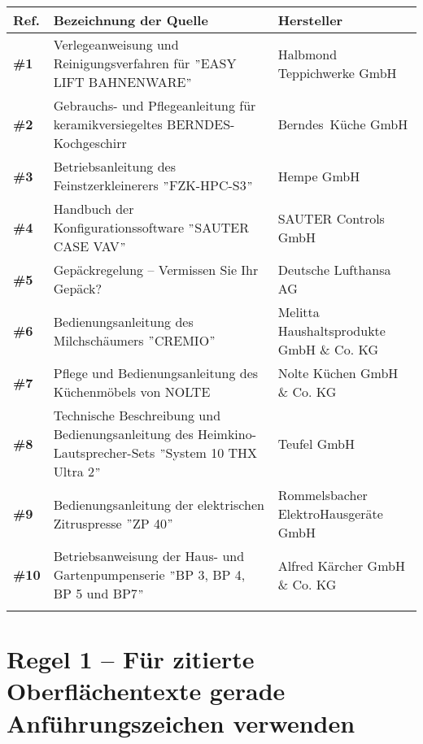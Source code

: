 \begin{tabularx}{\textwidth}{lXp{}}

\lsptoprule

{\textbf{Ref.}} & \textbf{Bezeichnung der Quelle} & \textbf{Hersteller}\\
\midrule
 \textbf{\#1} & Verlegeanweisung und Reinigungsverfahren für $"$EASY LIFT BAHNENWARE$"$ & Halbmond Teppichwerke GmbH\\
 \tablevspace
 \textbf{\#2} & Gebrauchs- und Pflegeanleitung für keramikversiegeltes BERNDES-Kochgeschirr & Berndes~Küche GmbH\\
 \tablevspace
 \textbf{\#3} & Betriebsanleitung des Feinstzerkleinerers $"$FZK-HPC-S3$"$ & Hempe GmbH\\
 \tablevspace
 \textbf{\#4} & Handbuch der Konfigurationssoftware $"$SAUTER CASE VAV$"$ & SAUTER Controls GmbH\\
 \tablevspace
 \textbf{\#5} & Gepäckregelung – Vermissen Sie Ihr Gepäck? & Deutsche Lufthansa AG\\
 \tablevspace
 \textbf{\#6} & Bedienungsanleitung des Milchschäumers $"$CREMIO$"$ & Melitta Haushaltsprodukte GmbH \& Co. KG\\
 \tablevspace
 \textbf{\#7} & Pflege und Bedienungsanleitung des Küchenmöbels von NOLTE & Nolte Küchen GmbH \& Co. KG\\
 \tablevspace
 \textbf{\#8} & Technische Beschreibung und Bedienungsanleitung des Heimkino-Lautsprecher-Sets $"$System 10 THX Ultra 2$"$ & Teufel GmbH\\
 \tablevspace
 \textbf{\#9} & Bedienungsanleitung der elektrischen Zitruspresse $"$ZP 40$"$ & Rommelsbacher ElektroHausgeräte GmbH\\
 \tablevspace
 \textbf{\#10} & Betriebsanweisung der Haus- und Gartenpumpenserie $"$BP 3, BP 4, BP 5 und BP7$"$ & Alfred Kärcher GmbH \& Co. KG\\
\lspbottomrule
\end{tabularx}


\section*{Regel 1 -- Für zitierte Oberflächentexte gerade Anführungszeichen verwenden}


